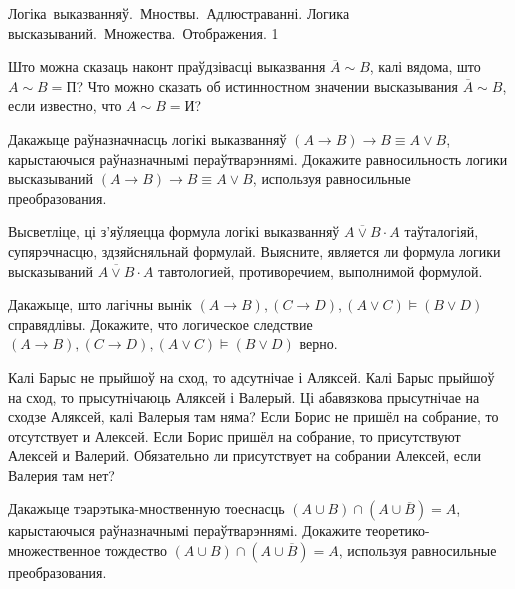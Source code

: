 



\quizTitle
{Логіка~выказванняў.~Мноствы.~Адлюстраванні.}
{Логика высказываний.~Множества.~Отображения.}
{1}

\begin{problemList}

\problemItemSimple
{Што можна сказаць наконт праўдзівасці выказвання $\overline{A} \sim B$, калі вядома, што $A \sim B = \mbox{П}$?}
{Что можно сказать об истинностном значении высказывания $\overline{A} \sim B$, если известно, что $A \sim B = \mbox{И}$?}

\bigskip

\problemItemSimple
{Дакажыце раўназначнасць логікі выказванняў $(A \to B) \to B \equiv A \vee B$, карыстаючыся раўназначнымі пераўтварэннямі.}
{Докажите равносильность логики высказываний $(A \to B) \to B \equiv A \vee B$, используя равносильные преобразования.}

\bigskip

\problemItemSimple
{Высветліце, ці з'яўляецца формула логікі выказванняў $\overline{A \vee B} \cdot A$ таўталогіяй, супярэчнасцю, здзяйсняльнай формулай.}
{Выясните, является ли формула логики высказываний $\overline{A \vee B} \cdot A$ тавтологией, противоречием, выполнимой формулой.}

\bigskip

\problemItemSimple
{Дакажыце, што лагічны вынік $(A \to B), (C \to D), (A \vee C) \models (B \vee D)$ справядлівы.}
{Докажите, что логическое следствие $(A \to B), (C \to D), (A \vee C) \models (B \vee D)$ верно.}

\bigskip

\problemItemSimple
{Калі Барыс не прыйшоў на сход, то адсутнічае і Аляксей. Калі Барыс прыйшоў на сход, то прысутнічаюць Аляксей і Валерый. Ці абавязкова прысутнічае на сходзе Аляксей, калі Валерыя там няма?}
{Если Борис не пришёл на собрание, то отсутствует и Алексей. Если Борис пришёл на собрание, то присутствуют Алексей и Валерий. Обязательно ли присутствует на собрании Алексей, если Валерия там нет?}

\bigskip

\problemItemSimple
{Дакажыце тэарэтыка-мноственную тоеснасць $(A \cup B) \cap (A \cup \overline{B}) = A$, карыстаючыся раўназначнымі пераўтварэннямі.}
{Докажите теоретико-множественное тождество $(A \cup B) \cap (A \cup \overline{B}) = A$, используя равносильные преобразования.}

\bigskip


\end{problemList}
